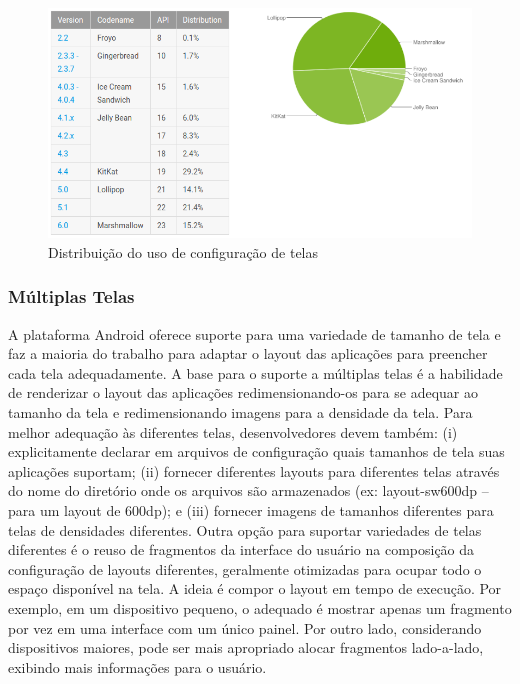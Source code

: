 \begin{figure}[ht]
\centering
\includegraphics[width=1\textwidth]{imagens/platform_versions.png}
\caption{Distribuição do uso de configuração de telas \cite{Dashboard}}
\label{fig:platform_versions}
\end{figure}

\subsubsection{Múltiplas Telas}
A plataforma Android oferece suporte para uma variedade de tamanho de tela e faz
a maioria do trabalho para adaptar o layout das aplicações para preencher cada tela
adequadamente. A base para o suporte a múltiplas telas é a habilidade de renderizar
o layout das aplicações redimensionando-os para se adequar ao tamanho da tela e
redimensionando imagens para a densidade da tela. Para melhor adequação às diferentes
telas, desenvolvedores devem também: (i) explicitamente declarar em arquivos de
configuração quais tamanhos de tela suas aplicações suportam; (ii) fornecer diferentes
layouts para diferentes telas através do nome do diretório onde os arquivos são
armazenados (ex: layout-sw600dp – para um layout de 600dp); e (iii) fornecer
imagens de tamanhos diferentes para telas de densidades diferentes. Outra opção
para suportar variedades de telas diferentes é o reuso de fragmentos da interface
do usuário na composição da configuração de layouts diferentes, geralmente
otimizadas para ocupar todo o espaço disponível na tela. A ideia é compor o
layout em tempo de execução. Por exemplo, em um dispositivo pequeno, o adequado
é mostrar apenas um fragmento por vez em uma interface com um único painel.
Por outro lado, considerando dispositivos maiores, pode ser mais apropriado alocar
fragmentos lado-a-lado, exibindo mais informações para o usuário.

